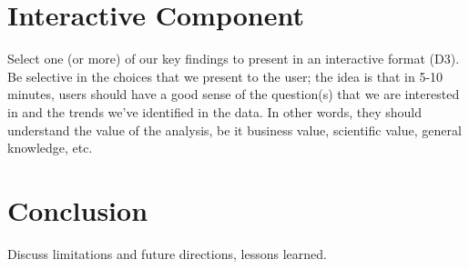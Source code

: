 \documentclass[]{book}
\begin{document}
\hypertarget{interactive-component}{%
\chapter{Interactive Component}\label{interactive-component}}

Select one (or more) of our key findings to present in an interactive format (D3). Be selective in the choices that we present to the user; the idea is that in 5-10 minutes, users should have a good sense of the question(s) that we are interested in and the trends we've identified in the data. In other words, they should understand the value of the analysis, be it business value, scientific value, general knowledge, etc.

\hypertarget{conclusion}{%
\chapter{Conclusion}\label{conclusion}}

Discuss limitations and future directions, lessons learned.


\end{document}
